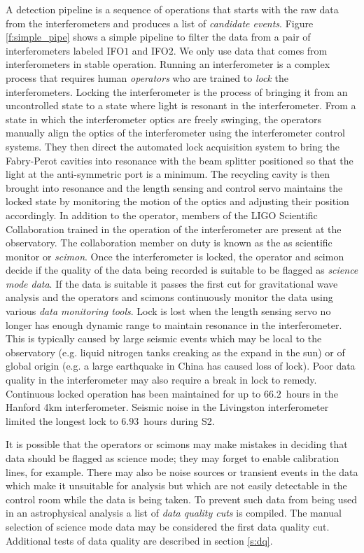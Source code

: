 A detection pipeline is a sequence of operations that starts with the raw data
from the interferometers and produces a list of \emph{candidate events}.
Figure \ref{f:simple_pipe} shows a simple pipeline to filter the data from a
pair of interferometers labeled IFO$1$ and IFO$2$.
We only use data that comes from interferometers in stable operation. Running
an interferometer is a complex process that requires human \emph{operators}
who are trained to \emph{lock} the interferometers. Locking the interferometer
is the process of bringing it from an uncontrolled state 
to a state where light is resonant in the interferometer.  From a
state in which the interferometer optics are freely swinging, the operators
manually align the optics of the interferometer using the interferometer
control systems. They then direct the automated lock acquisition
system\cite{Evans:thesis} to bring the Fabry-Perot cavities into resonance
with the beam splitter positioned so that the light at the anti-symmetric
port is a minimum. The recycling cavity is then brought into resonance and the
length sensing and control servo maintains the locked state by monitoring the
motion of the optics and adjusting their position accordingly.   In addition
to the operator, members of the LIGO Scientific Collaboration trained in the
operation of the interferometer are present at the observatory. The
collaboration member on duty is known as the as scientific monitor or
\emph{scimon}. Once the interferometer is locked, the operator and scimon
decide if the quality of the data being recorded is suitable to be flagged as
\emph{science mode data}. If the data is suitable it passes the first cut for
gravitational wave analysis and the operators and scimons continuously monitor
the data using various \emph{data monitoring tools}. Lock is lost
when the length sensing servo no longer has enough dynamic range to maintain
resonance in the interferometer. This is typically caused by large seismic
events which may be local to the observatory (e.g. liquid nitrogen tanks
creaking as the expand in the sun) or of global origin (e.g. a large
earthquake in China has caused loss of lock). Poor data quality in the
interferometer may also require a break in lock to remedy.  Continuous
locked operation has been maintained for up to $66.2$~hours in
the Hanford 4km interferometer. Seismic noise in the Livingston interferometer
limited the longest lock to $6.93$~hours during S2.

It is possible that the operators or scimons may make mistakes in deciding
that data should be flagged as science mode; they may forget to enable
calibration lines, for example. There may also be noise sources or transient
events in the data which make it unsuitable for analysis but which are not
easily detectable in the control room while the data is being taken. To
prevent such data from being used in an astrophysical analysis a list of
\emph{data quality cuts} is compiled. The manual selection of science mode
data may be considered the first data quality cut.  Additional tests of data
quality are described in section \ref{s:dq}.

